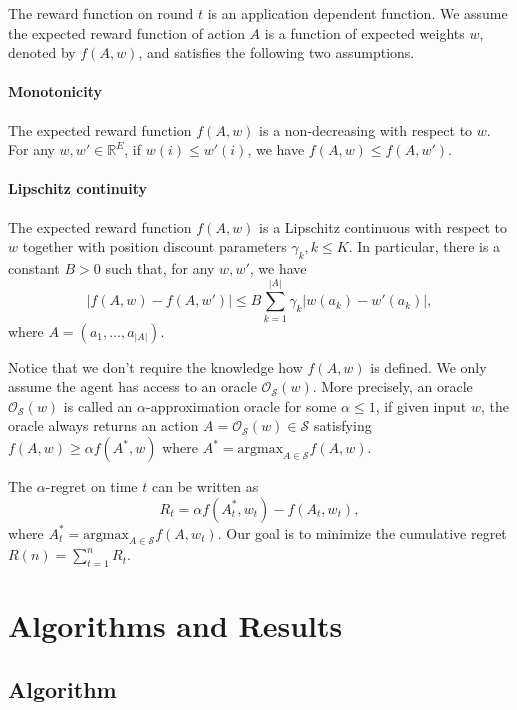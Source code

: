 \documentclass{article}
\newcommand{\RR}{\mathbb{R}}
\newcommand{\cO}{\mathcal{O}}
\newcommand{\cS}{\mathcal{S}}
\newcommand{\argmax}{\mathrm{argmax}}
\begin{document}
The reward function on round $t$ is an application dependent function. We assume the expected reward function of action $A$ is a function of expected weights $w$, denoted by $f(A,w)$, and satisfies the following two assumptions.

\paragraph{Monotonicity}
The expected reward function $f(A, w)$ is a non-decreasing with respect to $w$. For any $w,w'\in \RR^E$, if $w(i) \leq w'(i)$, we have $f(A, w) \leq f(A, w')$.

\paragraph{Lipschitz continuity}
The expected reward function $f(A, w)$ is a Lipschitz continuous with respect to $w$ together with position discount parameters $\gamma_k, k\leq K$. In particular, there is a constant $B>0$ such that, for any $w,w'$, we have
$$
	|f(A, w) - f(A, w')| \leq B \sum_{k=1}^{|A|} \gamma_k |w(a_k) - w'(a_k)|,
$$
where $A = (a_1, \ldots, a_{|A|})$.

Notice that we don't require the knowledge how $f(A, w)$ is defined. We only assume the agent has access to an oracle $\cO_{\cS}(w)$. More precisely, an oracle $\cO_{\cS}(w)$ is  called an $\alpha$-approximation oracle for some $\alpha \leq 1$, if given input $w$, the oracle always returns an action $A = \cO_{\cS}(w) \in \cS$ satisfying $f(A,w) \geq \alpha f(A^*,w)$ where $A^* = \argmax_{A\in\cS} f(A, w)$.

The $\alpha$-regret on time $t$ can be written as
$$
R_t = \alpha f(A_t^*, w_t) - f(A_t, w_t),
$$
where $A_t^* = \argmax_{A\in\cS} f(A, w_t)$. Our goal is to minimize the cumulative regret $R(n) = \sum_{t=1}^n R_t$.

\section{Algorithms and Results}

\subsection{Algorithm}
\end{document}
